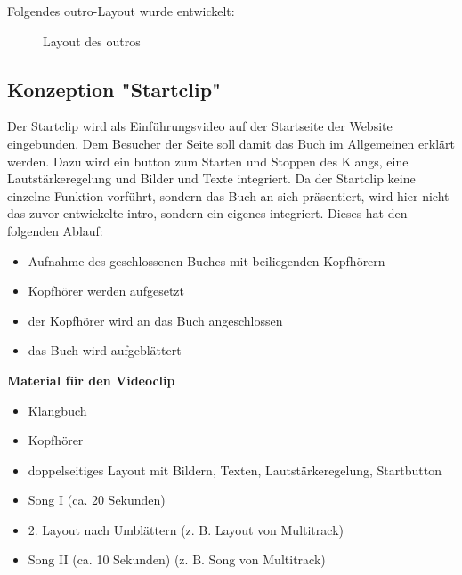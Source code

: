 Folgendes \gls{outro}-Layout wurde entwickelt:

\begin{figure}[H]
\centering
{}
\caption{Layout des \gls{outro}s}
\end{figure}



\subsection{Konzeption "Startclip"}
Der Startclip wird als Einführungsvideo auf der Startseite der Website eingebunden. Dem Besucher der Seite soll damit das Buch im Allgemeinen erklärt werden. Dazu wird ein \gls{button} zum Starten und Stoppen des Klangs, eine Lautstärkeregelung und Bilder und Texte integriert. Da der Startclip keine einzelne Funktion vorführt, sondern das Buch an sich präsentiert, wird hier nicht das zuvor entwickelte \gls{intro}, sondern ein eigenes integriert. Dieses hat den folgenden Ablauf:

\begin{itemize}
\item Aufnahme des geschlossenen Buches mit beiliegenden Kopfhörern
\item Kopfhörer werden aufgesetzt
\item der Kopfhörer wird an das Buch angeschlossen
\item das Buch wird aufgeblättert
\end{itemize}


\textbf{Material für den Videoclip}
\begin{itemize}
\item Klangbuch
\item Kopfhörer
\item doppelseitiges Layout mit Bildern, Texten, Lautstärkeregelung, Start\gls{button}
\item Song I (ca. 20 Sekunden)
\item 2. Layout nach Umblättern (z. B. Layout von Multitrack)
\item Song II (ca. 10 Sekunden) (z. B. Song von Multitrack)
\end{itemize}

